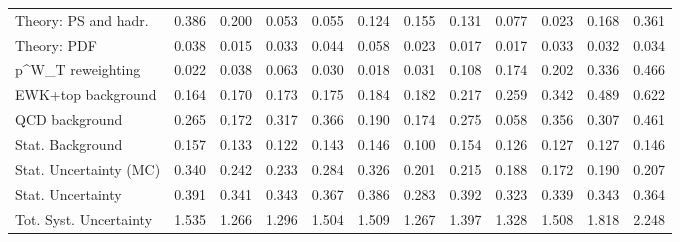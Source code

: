 \begin{tabular}{l|p{0.6cm}p{0.6cm}p{0.6cm}p{0.6cm}p{0.6cm}p{0.6cm}p{0.6cm}p{0.6cm}p{0.6cm}p{0.6cm}p{0.6cm}}
Theory: PS and hadr.                     & 0.386 & 0.200 & 0.053 & 0.055 & 0.124 & 0.155 & 0.131 & 0.077 & 0.023 & 0.168 & 0.361 \\
Theory: PDF                              & 0.038 & 0.015 & 0.033 & 0.044 & 0.058 & 0.023 & 0.017 & 0.017 & 0.033 & 0.032 & 0.034 \\
p^{W}_{T} reweighting                    & 0.022 & 0.038 & 0.063 & 0.030 & 0.018 & 0.031 & 0.108 & 0.174 & 0.202 & 0.336 & 0.466 \\
EWK+top background                       & 0.164 & 0.170 & 0.173 & 0.175 & 0.184 & 0.182 & 0.217 & 0.259 & 0.342 & 0.489 & 0.622 \\
QCD background                           & 0.265 & 0.172 & 0.317 & 0.366 & 0.190 & 0.174 & 0.275 & 0.058 & 0.356 & 0.307 & 0.461 \\
Stat. Background                         & 0.157 & 0.133 & 0.122 & 0.143 & 0.146 & 0.100 & 0.154 & 0.126 & 0.127 & 0.127 & 0.146 \\
Stat. Uncertainty (MC)                   & 0.340 & 0.242 & 0.233 & 0.284 & 0.326 & 0.201 & 0.215 & 0.188 & 0.172 & 0.190 & 0.207 \\
\hline
Stat. Uncertainty                        & 0.391 & 0.341 & 0.343 & 0.367 & 0.386 & 0.283 & 0.392 & 0.323 & 0.339 & 0.343 & 0.364 \\
\hline
Tot. Syst. Uncertainty                   & 1.535 & 1.266 & 1.296 & 1.504 & 1.509 & 1.267 & 1.397 & 1.328 & 1.508 & 1.818 & 2.248 \\
\hline
\end{tabular}
